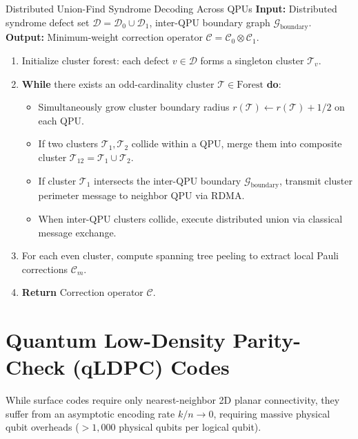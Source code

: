 \begin{algorithmbox}{Distributed Union-Find Syndrome Decoding Across QPUs}
\textbf{Input:} Distributed syndrome defect set $\mathcal{D} = \mathcal{D}_0 \cup \mathcal{D}_1$, inter-QPU boundary graph $\mathcal{G}_{\text{boundary}}$.\\
\textbf{Output:} Minimum-weight correction operator $\mathcal{C} = \mathcal{C}_0 \otimes \mathcal{C}_1$.
\begin{enumerate}[leftmargin=1.5em]
    \item Initialize cluster forest: each defect $v \in \mathcal{D}$ forms a singleton cluster $\mathcal{T}_v$.
    \item \textbf{While} there exists an odd-cardinality cluster $\mathcal{T} \in \text{Forest}$ \textbf{do}:
    \begin{itemize}
        \item Simultaneously grow cluster boundary radius $r(\mathcal{T}) \leftarrow r(\mathcal{T}) + 1/2$ on each QPU.
        \item If two clusters $\mathcal{T}_1, \mathcal{T}_2$ collide within a QPU, merge them into composite cluster $\mathcal{T}_{12} = \mathcal{T}_1 \cup \mathcal{T}_2$.
        \item If cluster $\mathcal{T}_1$ intersects the inter-QPU boundary $\mathcal{G}_{\text{boundary}}$, transmit cluster perimeter message to neighbor QPU via RDMA.
        \item When inter-QPU clusters collide, execute distributed union via classical message exchange.
    \end{itemize}
    \item For each even cluster, compute spanning tree peeling to extract local Pauli corrections $\mathcal{C}_m$.
    \item \textbf{Return} Correction operator $\mathcal{C}$.
\end{enumerate}
\end{algorithmbox}

\section{Quantum Low-Density Parity-Check (qLDPC) Codes}
\label{sec:qldpc_codes}

While surface codes require only nearest-neighbor 2D planar connectivity, they suffer from an asymptotic encoding rate $k/n \to 0$, requiring massive physical qubit overheads ($>1,000$ physical qubits per logical qubit).

